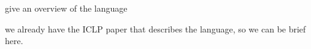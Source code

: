 
give an overview of the language

we already have the ICLP paper that describes the language, so we can be brief
here. \cite{cruz-iclp14}
